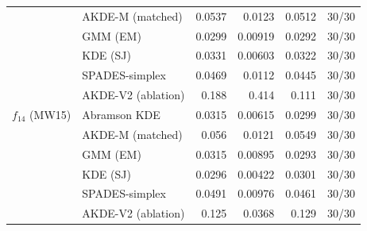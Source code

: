 \begin{tabular}{llrrrr}
 & AKDE-M (matched) & 0.0537 & 0.0123 & 0.0512 & 30/30 \\
 & GMM (EM) & 0.0299 & 0.00919 & 0.0292 & 30/30 \\
 & KDE (SJ) & 0.0331 & 0.00603 & 0.0322 & 30/30 \\
 & SPADES-simplex & 0.0469 & 0.0112 & 0.0445 & 30/30 \\
 & AKDE-V2 (ablation) & 0.188 & 0.414 & 0.111 & 30/30 \\
$f_{14}$ (MW15) & Abramson KDE & 0.0315 & 0.00615 & 0.0299 & 30/30 \\
 & AKDE-M (matched) & 0.056 & 0.0121 & 0.0549 & 30/30 \\
 & GMM (EM) & 0.0315 & 0.00895 & 0.0293 & 30/30 \\
 & KDE (SJ) & 0.0296 & 0.00422 & 0.0301 & 30/30 \\
 & SPADES-simplex & 0.0491 & 0.00976 & 0.0461 & 30/30 \\
 & AKDE-V2 (ablation) & 0.125 & 0.0368 & 0.129 & 30/30 \\
\bottomrule
\end{tabular}